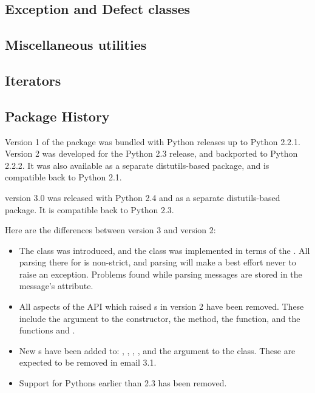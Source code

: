 \subsection{Exception and Defect classes}


\subsection{Miscellaneous utilities}


\subsection{Iterators}


\subsection{Package History}

Version 1 of the  package was bundled with Python
releases up to Python 2.2.1.  Version 2 was developed for the Python
2.3 release, and backported to Python 2.2.2.  It was also available as
a separate distutils-based package, and is compatible back to Python 2.1.

 version 3.0 was released with Python 2.4 and as a separate
distutils-based package.  It is compatible back to Python 2.3.

Here are the differences between  version 3 and version 2:

\begin{itemize}
\item The  class was introduced, and the 
      class was implemented in terms of the .  All parsing
      there for is non-strict, and parsing will make a best effort never to
      raise an exception.  Problems found while parsing messages are stored in
      the message's  attribute.

\item All aspects of the API which raised s in
      version 2 have been removed.  These include the  argument
      to the  constructor, the 
      method, the  function, and the
      functions  and .

\item New s have been added to:
      , ,
      , , and
      the  argument to the  class.  These are
      expected to be removed in email 3.1.

\item Support for Pythons earlier than 2.3 has been removed.
\end{itemize}

